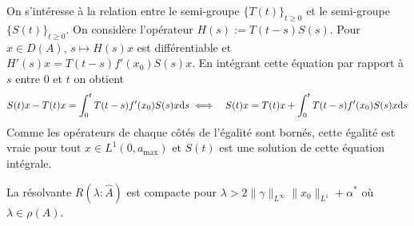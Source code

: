 On s'intéresse à la relation entre le semi-groupe $\big\{T(t)\big\}_{t \geq 0}$ et le semi-groupe $\big\{S(t)\big\}_{t \geq 0}$. On considère l'opérateur $H(s):=T(t-s)S(s)$. Pour $x \in D(A)$, $s \mapsto H(s)x$ est différentiable et $H'(s)x = T(t-s)f'(x_0)S(s)x$. En intégrant cette équation par rapport à $s$ entre $0$ et $t$ on obtient 
\begin{eqnarray*}
    S(t)x-T(t)x = \int_0^tT(t-s)f'(x_0)S(s)x\mathrm{d} s &\iff& S(t)x=T(t)x+\int_0^tT(t-s)f'(x_0)S(s)x\mathrm{d} s
\end{eqnarray*}
Comme les opérateurs de chaque côtés de l'égalité sont bornés, cette égalité est vraie pour tout $x \in L^1(0,a_{\max})$ et $S(t)$ est une solution de cette équation intégrale.

\begin{proposition}\label{prop_res_compact_A_chapeau}
    La résolvante $R(\lambda : \hat{A})$ est compacte pour $\lambda > 2\|\gamma\|_{L^\infty}\|x_0\|_{L^1}+\alpha^*$ où $\lambda \in \rho(A)$.
\end{proposition}

